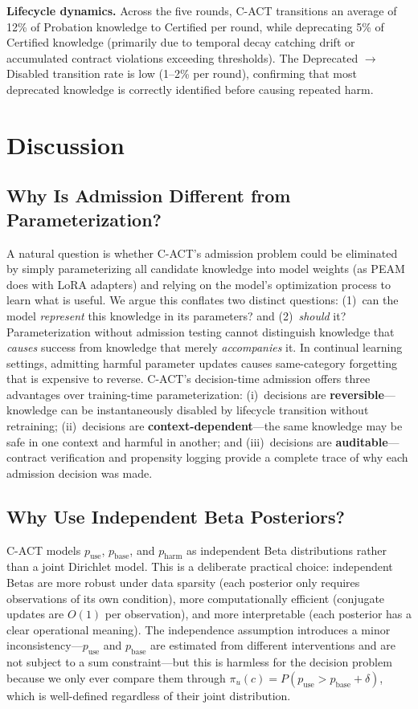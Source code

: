 \documentclass[letterpaper]{article}
\begin{document}
\textbf{Lifecycle dynamics.} Across the five rounds, \textsc{C-ACT} transitions an average of 12\% of Probation knowledge to Certified per round, while deprecating 5\% of Certified knowledge (primarily due to temporal decay catching drift or accumulated contract violations exceeding thresholds). The Deprecated $\rightarrow$ Disabled transition rate is low (1--2\% per round), confirming that most deprecated knowledge is correctly identified before causing repeated harm.

\section{Discussion}

\subsection{Why Is Admission Different from Parameterization?}

A natural question is whether \textsc{C-ACT}'s admission problem could be eliminated by simply parameterizing all candidate knowledge into model weights (as PEAM does with LoRA adapters) and relying on the model's optimization process to learn what is useful. We argue this conflates two distinct questions: (1)~can the model \emph{represent} this knowledge in its parameters? and (2)~\emph{should} it? Parameterization without admission testing cannot distinguish knowledge that \emph{causes} success from knowledge that merely \emph{accompanies} it. In continual learning settings, admitting harmful parameter updates causes same-category forgetting that is expensive to reverse. \textsc{C-ACT}'s decision-time admission offers three advantages over training-time parameterization: (i)~decisions are \textbf{reversible}---knowledge can be instantaneously disabled by lifecycle transition without retraining; (ii)~decisions are \textbf{context-dependent}---the same knowledge may be safe in one context and harmful in another; and (iii)~decisions are \textbf{auditable}---contract verification and propensity logging provide a complete trace of why each admission decision was made.

\subsection{Why Use Independent Beta Posteriors?}

\textsc{C-ACT} models $p_{\text{use}}$, $p_{\text{base}}$, and $p_{\text{harm}}$ as independent Beta distributions rather than a joint Dirichlet model. This is a deliberate practical choice: independent Betas are more robust under data sparsity (each posterior only requires observations of its own condition), more computationally efficient (conjugate updates are $O(1)$ per observation), and more interpretable (each posterior has a clear operational meaning). The independence assumption introduces a minor inconsistency---$p_{\text{use}}$ and $p_{\text{base}}$ are estimated from different interventions and are not subject to a sum constraint---but this is harmless for the decision problem because we only ever compare them through $\pi_u(c) = P(p_{\text{use}} > p_{\text{base}} + \delta)$, which is well-defined regardless of their joint distribution.
\end{document}
